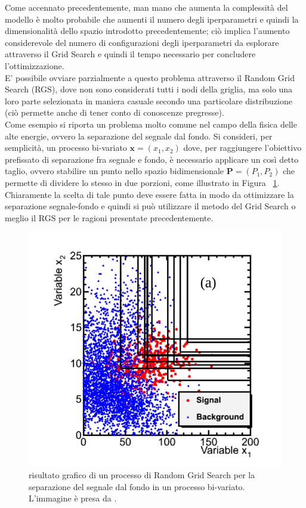 Come accennato precedentemente, man mano che aumenta la complessità del modello è molto probabile che aumenti il numero degli iperparametri e quindi la dimensionalità dello spazio introdotto precedentemente; ciò implica l'aumento considerevole del numero di configurazioni degli iperparametri da esplorare attraverso il Grid Search e quindi il tempo necessario per concludere l'ottimizzazione.\\
E' possibile ovviare parzialmente a questo problema attraverso il Random Grid Search (RGS), dove non sono considerati tutti i nodi della griglia, ma solo una loro parte selezionata in maniera casuale secondo una particolare distribuzione (ciò permette anche di tener conto di conoscenze pregresse). \\
Come esempio si riporta un problema molto comune nel campo della fisica delle alte energie, ovvero la separazione del segnale dal fondo. Si consideri, per semplicità, un processo bi-variato $\textbf{x} = (x_1,x_2)$ dove, per raggiungere l'obiettivo prefissato di separazione fra segnale e fondo, è necessario applicare un così detto taglio, ovvero stabilire un punto nello spazio bidimensionale $\textbf{P} = (P_1,P_2)$ che permette di dividere lo stesso in due porzioni, come illustrato in Figura ~\ref{fig:grid_example}.\\
Chiaramente la scelta di tale punto deve essere fatta in modo da ottimizzare la separazione segnale-fondo e quindi si può utilizzare il metodo del Grid Search o meglio il RGS per le ragioni presentate precedentemente. 

\begin{figure}[h!]
	\includegraphics[width=\linewidth]{figs/Grid_example.png}
	\caption{risultato grafico di un processo di Random Grid Search per la separazione del segnale dal fondo in un processo bi-variato. L'immagine è presa da \cite{Metodi_multivariati}.}
	\label{fig:grid_example}
\end{figure}
\newpage

